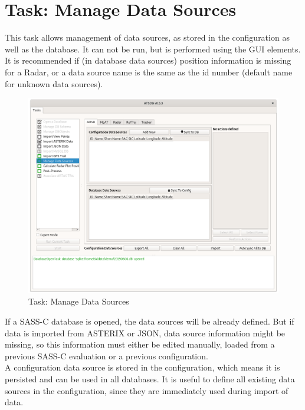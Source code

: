 \section{Task: Manage Data Sources}
\label{sec:task_manage_datasources}

This task allows management of data sources, as stored in the configuration as well as the database. It can not be run, but is performed using the GUI elements. \\

It is recommended if (in database data sources) position information is missing for a Radar, or a data source name is the same as the id number (default name for unknown data sources).

\begin{figure}[H]
  \hspace*{-2.5cm}
    \includegraphics[width=19cm]{figures/manage_data_sources.png}
  \caption{Task: Manage Data Sources}
\end{figure}

If a SASS-C database is opened, the data sources will be already defined. But if data is imported from ASTERIX or JSON, data source information might be missing, so this information must either be edited manually, loaded from a previous SASS-C evaluation or a previous configuration. \\

A configuration data source is stored in the configuration, which means it is persisted and can be used in all databases. It is useful to define all existing data sources in the configuration, since they are immediately used during import of data. \\

